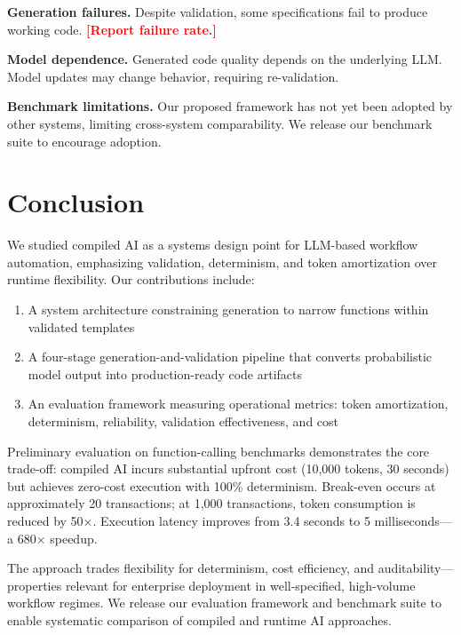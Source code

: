 \documentclass[11pt]{article}
\newcommand{\placeholder}[1]{\textcolor{red}{\textbf{[#1]}}}
\begin{document}
\textbf{Generation failures.} Despite validation, some specifications fail to produce working code. \placeholder{Report failure rate.}

\textbf{Model dependence.} Generated code quality depends on the underlying LLM. Model updates may change behavior, requiring re-validation.

\textbf{Benchmark limitations.} Our proposed framework has not yet been adopted by other systems, limiting cross-system comparability. We release our benchmark suite to encourage adoption.

\section{Conclusion}
\label{sec:conclusion}

We studied compiled AI as a systems design point for LLM-based workflow automation, emphasizing validation, determinism, and token amortization over runtime flexibility. Our contributions include:

\begin{enumerate}
    \item A system architecture constraining generation to narrow functions within validated templates
    \item A four-stage generation-and-validation pipeline that converts probabilistic model output into production-ready code artifacts
    \item An evaluation framework measuring operational metrics: token amortization, determinism, reliability, validation effectiveness, and cost
\end{enumerate}

Preliminary evaluation on function-calling benchmarks demonstrates the core trade-off: compiled AI incurs substantial upfront cost (10,000 tokens, 30 seconds) but achieves zero-cost execution with 100\% determinism. Break-even occurs at approximately 20 transactions; at 1,000 transactions, token consumption is reduced by 50$\times$. Execution latency improves from 3.4 seconds to 5 milliseconds---a 680$\times$ speedup.

The approach trades flexibility for determinism, cost efficiency, and auditability---properties relevant for enterprise deployment in well-specified, high-volume workflow regimes. We release our evaluation framework and benchmark suite to enable systematic comparison of compiled and runtime AI approaches.
\end{document}
